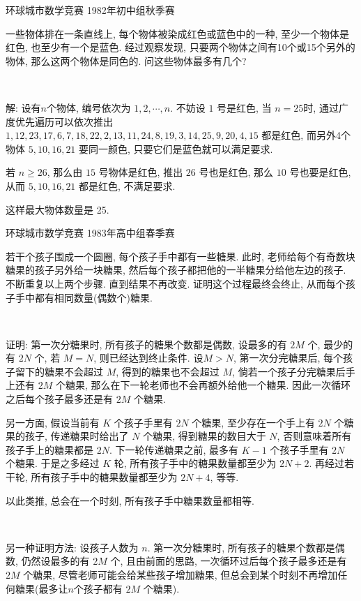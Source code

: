 \newpage
\noindent 环球城市数学竞赛 1982年初中组秋季赛

一些物体排在一条直线上, 每个物体被染成红色或蓝色中的一种, 至少一个物体是红色, 也至少有一个是蓝色. 经过观察发现, 只要两个物体之间有10个或15个另外的物体, 那么这两个物体是同色的. 问这些物体最多有几个?

~

解: 设有$n$个物体, 编号依次为 $1,2,\cdots,n$. 不妨设 $1$ 号是红色, 当 $n=25$时, 通过广度优先遍历可以依次推出 $1, 12, 23, 17, 6, 7, 18, 22, 2, 13, 11, 24, 8, 19, 3, 14, 25, 9, 20, 4, 15$ 都是红色, 而另外4个物体 $5, 10, 16, 21$ 要同一颜色, 只要它们是蓝色就可以满足要求. 

若 $n\ge 26$, 那么由 $15$ 号物体是红色, 推出 $26$ 号也是红色, 那么 $10$ 号也要是红色, 从而 $5,10,16,21$ 都是红色, 不满足要求.

这样最大物体数量是 25.

\newpage
\noindent 环球城市数学竞赛 1983年高中组春季赛

若干个孩子围成一个圆圈, 每个孩子手中都有一些糖果. 此时, 老师给每个有奇数块糖果的孩子另外给一块糖果, 然后每个孩子都把他的一半糖果分给他左边的孩子. 不断重复以上两个步骤. 直到结果不再改变. 证明这个过程最终会终止, 从而每个孩子手中都有相同数量(偶数个)糖果.

~

证明: 第一次分糖果时, 所有孩子的糖果个数都是偶数, 设最多的有 $2M$ 个, 最少的有 $2N$ 个, 若 $M=N$, 则已经达到终止条件. 设$M>N$, 第一次分完糖果后, 每个孩子留下的糖果不会超过 $M$, 得到的糖果也不会超过 $M$, 倘若一个孩子分完糖果后手上还有 $2M$ 个糖果, 那么在下一轮老师也不会再额外给他一个糖果. 因此一次循环之后每个孩子最多还是有 $2M$ 个糖果. 

另一方面, 假设当前有 $K$ 个孩子手里有 $2N$ 个糖果, 至少存在一个手上有 $2N$ 个糖果的孩子, 传递糖果时给出了 $N$ 个糖果, 得到糖果的数目大于 $N$, 否则意味着所有孩子手上的糖果都是 $2N$. 下一轮传递糖果之前, 最多有 $K - 1$ 个孩子手里有 $2N$ 个糖果. 于是之多经过 $K$ 轮, 所有孩子手中的糖果数量都至少为 $2N+2$. 再经过若干轮, 所有孩子手中的糖果数量都至少为 $2N+4$, 等等.

以此类推, 总会在一个时刻, 所有孩子手中糖果数量都相等.

~

另一种证明方法: 设孩子人数为 $n$. 第一次分糖果时, 所有孩子的糖果个数都是偶数, 仍然设最多的有 $2M$ 个, 且由前面的思路, 一次循环过后每个孩子最多还是有 $2M$ 个糖果, 尽管老师可能会给某些孩子增加糖果, 但总会到某个时刻不再增加任何糖果(最多让$n$个孩子都有 $2M$ 个糖果).

